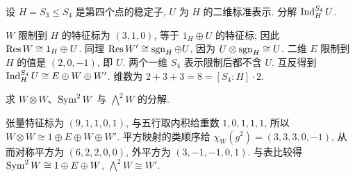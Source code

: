\begin{example}
设 $H=S_3\le S_4$ 是第四个点的稳定子, $U$ 为 $H$ 的二维标准表示. 分解 $\operatorname{Ind}_H^{S_4}U$.
\end{example}
\begin{solution}
$W$ 限制到 $H$ 的特征标为 $(3,1,0)$, 等于 $1_H\oplus U$ 的特征标; 因此 $\operatorname{Res} W\cong1_H\oplus U$. 同理 $\operatorname{Res} W'\cong\operatorname{sgn}_H\oplus U$, 因为 $U\otimes\operatorname{sgn}_H\cong U$. 二维 $E$ 限制到 $H$ 的值是 $(2,0,-1)$, 即 $U$. 两个一维 $S_4$ 表示限制后都不含 $U$. 互反得到 $\operatorname{Ind}_H^{S_4}U\cong E\oplus W\oplus W'$. 维数为 $2+3+3=8=[S_4:H]\cdot2$.
\end{solution}

\begin{exercise}
求 $W\otimes W$、$\operatorname{Sym}^2W$ 与 $\bigwedge^2W$ 的分解.
\end{exercise}
\begin{solution}
张量特征标为 $(9,1,1,0,1)$, 与五行取内积给重数 $1,0,1,1,1$, 所以 $W\otimes W\cong1\oplus E\oplus W\oplus W'$. 平方映射的类顺序给 $\chi_W(g^2)=(3,3,3,0,-1)$, 从而对称平方为 $(6,2,2,0,0)$, 外平方为 $(3,-1,-1,0,1)$. 与表比较得 $\operatorname{Sym}^2W\cong1\oplus E\oplus W$, $\bigwedge^2W\cong W'$.
\end{solution}
